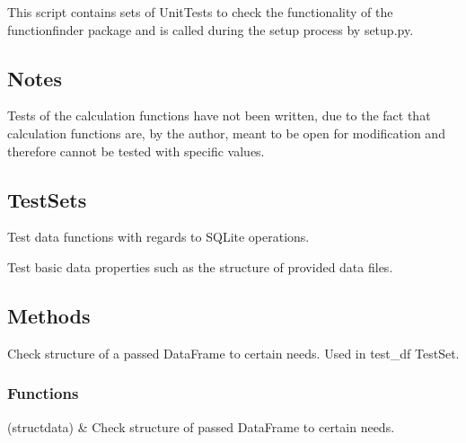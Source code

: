 \documentclass[letterpaper,10pt,english]{sphinxmanual}
\begin{document}
\sphinxAtStartPar
This script contains sets of UnitTests to check the functionality of the
functionfinder package and is called during the setup process by setup.py.


\subsection{Notes}
\label{\detokenize{_autosummary/tests.test_unit:notes}}
\sphinxAtStartPar
Tests of the calculation functions have not been written, due to the fact that
calculation functions are, by the author, meant to be open for modification and
therefore cannot be tested with specific values.


\subsection{TestSets}
\label{\detokenize{_autosummary/tests.test_unit:testsets}}\begin{description}
\sphinxAtStartPar
Test data functions with regards to SQLite operations.

\sphinxAtStartPar
Test basic data properties such as the structure of provided data files.

\end{description}


\subsection{Methods}
\label{\detokenize{_autosummary/tests.test_unit:methods}}\begin{description}
\sphinxAtStartPar
Check structure of a passed DataFrame to certain needs. Used in test\_df
TestSet.

\end{description}
\subsubsection*{Functions}


\begin{savenotes}\sphinxattablestart
\sphinxthistablewithglobalstyle
\sphinxthistablewithnovlinesstyle
\centering
\begin{tabulary}{\linewidth}[t]{}
\sphinxtoprule
\sphinxtableatstartofbodyhook
\sphinxAtStartPar
{\hyperref[\detokenize{_autosummary/tests.test_unit.check_struct:tests.test_unit.check_struct}]{}}(structdata)
&
\sphinxAtStartPar
Check structure of passed DataFrame to certain needs.
\\
\sphinxbottomrule
\end{tabulary}
\sphinxtableafterendhook\par
\sphinxattableend\end{savenotes}
\end{document}
